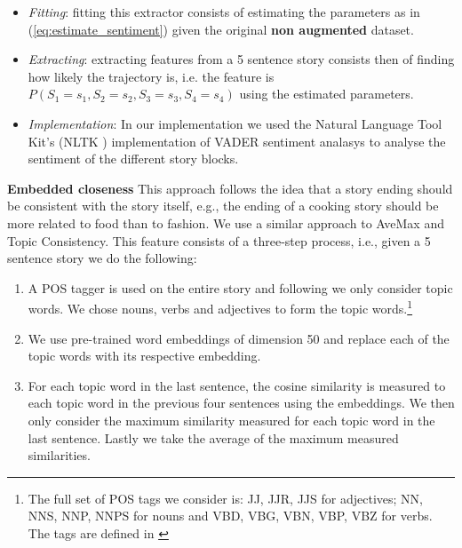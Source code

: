 \documentclass{article}
\begin{document}
\begin{itemize}
	\item \textit{Fitting}: fitting this extractor consists of estimating the parameters as in (\ref{eq:estimate_sentiment}) given the original \textbf{non augmented} dataset.
	\item \textit{Extracting}: extracting features from a 5 sentence story consists then of finding how likely the trajectory is, i.e. the feature is $P(S_1 = s_1, S_2=s_2, S_3=s_3, S_4=s_4)$ using the estimated parameters.
	\item \textit{Implementation}: In our implementation we used the Natural Language Tool Kit's (NLTK \cite{NLTK_VADER}) implementation of VADER sentiment analasys \cite{VADER} to analyse the sentiment of the different story blocks.
\end{itemize}

\textbf{Embedded closeness} This approach follows the idea that a story ending
should be consistent with the story itself, e.g., the ending of a cooking story
should be more related to food than to fashion. We use a similar approach to
AveMax\cite{LSTMClassifier} and Topic Consistency\cite{COGCOMP}. This feature
consists of a three-step process, i.e., given a 5 sentence story we do the
following:

\begin{enumerate}

        \item A POS tagger is used on the entire story and following
            \cite{COGCOMP} we only consider topic words. We chose nouns,
            verbs and adjectives to form the topic words.\footnote{The full set
                of POS tags we consider is: JJ, JJR, JJS for adjectives; NN,
                NNS, NNP, NNPS for  nouns and VBD, VBG, VBN, VBP, VBZ for verbs.
                The tags are defined in \cite{TREEBANK}}

        \item We use pre-trained word embeddings of dimension 50 and replace
            each of the topic words with its respective embedding.

        \item For each topic word in the last sentence, the cosine similarity is
            measured to each topic word in the previous four sentences using
            the embeddings. We then only consider the maximum similarity
            measured for each topic word in the last sentence. Lastly we take
            the average of the maximum measured similarities.

\end{enumerate}
\end{document}
